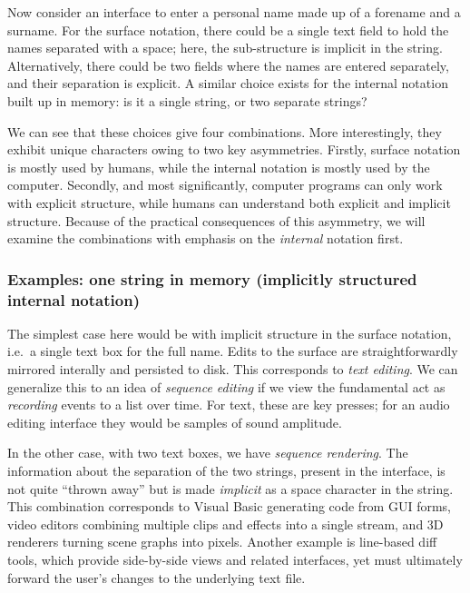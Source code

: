 \documentclass[english,submission]{programming}
\begin{document}
Now consider an interface to enter a personal name made up of a forename
and a surname. For the surface notation, there could be a single text
field to hold the names separated with a space; here, the sub-structure
is implicit in the string. Alternatively, there could be two fields
where the names are entered separately, and their separation is
explicit. A similar choice exists for the internal notation built up in
memory: is it a single string, or two separate strings?

We can see that these choices give four combinations. More
interestingly, they exhibit unique characters owing to two key
asymmetries. Firstly, surface notation is mostly used by humans, while
the internal notation is mostly used by the computer. Secondly, and most
significantly, computer programs can only work with explicit structure,
while humans can understand both explicit and implicit structure.
 Because of the practical
consequences of this asymmetry, we will examine the combinations with
emphasis on the \emph{internal} notation first.

\hypertarget{examples-one-string-in-memory-implicitly-structured-internal-notation}{%
\subsubsection{Examples: one string in memory (implicitly structured
internal
notation)}\label{examples-one-string-in-memory-implicitly-structured-internal-notation}}

The simplest case here would be with implicit structure in the surface
notation, i.e.~a single text box for the full name. Edits to the surface
are straightforwardly mirrored interally and persisted to disk. This
corresponds to \emph{text editing}. We can generalize this to an idea of
\emph{sequence editing} if we view the fundamental act as
\emph{recording} events to a list over time. For text, these are key
presses; for an audio editing interface they would be samples of sound
amplitude.

In the other case, with two text boxes, we have \emph{sequence
rendering}. The information about the separation of the two strings,
present in the interface, is not quite ``thrown away'' but is made
\emph{implicit} as a space character in the string. This combination
corresponds to Visual Basic generating code from GUI forms, video
editors combining multiple clips and effects into a single stream, and
3D renderers turning scene graphs into pixels. Another example is
line-based diff tools, which provide side-by-side views and related
interfaces, yet must ultimately forward the user's changes to the
underlying text file.
\end{document}
